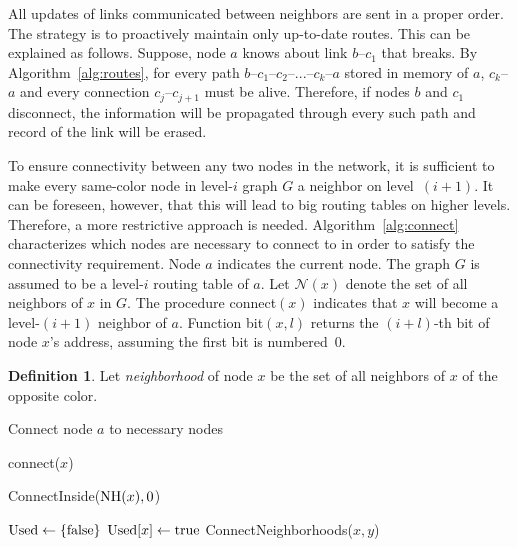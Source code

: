 \documentclass[conference]{IEEEtran}
\theoremstyle{definition}
\newtheorem{defn}{Definition}
\newcommand{\cN}{{\mathcal{N}}}
\begin{document}
All updates of links communicated between neighbors are sent in a proper order. The strategy is to proactively maintain only up-to-date routes. This can be explained as follows. Suppose, node $a$ knows about link $b$--$c_1$ that breaks. By Algorithm~\ref{alg:routes}, for every path $b$--$c_1$--$c_2$--...--$c_k$--$a$ stored in memory of $a$, $c_k$--$a$ and every connection $c_j$--$c_{j+1}$ must be alive. Therefore, if nodes $b$ and $c_1$ disconnect, the information will be propagated through every such path and record of the link will be erased.

To ensure connectivity between any two nodes in the network, it is sufficient to make every same-color node in level-$i$ graph $G$ a neighbor on level~$(i+1)$. It can be foreseen, however, that this will lead to big routing tables on higher levels. Therefore, a more restrictive approach is needed. Algorithm~\ref{alg:connect} characterizes which nodes are necessary to connect to in order to satisfy the connectivity requirement. Node $a$ indicates the current node. The graph $G$ is assumed to be a level-$i$ routing table of $a$. 
Let $\cN(x)$ denote the set of all neighbors of $x$ in $G$. The procedure  connect$(x)$ indicates that $x$ will become a level-$(i+1)$ neighbor of $a$. Function bit$(x, l)$ returns the $(i + l)$-th bit of node $x$'s address, assuming the first bit is numbered~0.

\begin{defn}
    Let \emph{neighborhood} of node $x$ be the set of all neighbors of $x$ of the opposite color.
    
    \label{defn:neighborhood}
\end{defn}

\begin{algorithm}
    \begin{algorithmic}[1]
        \caption{Connect node $a$ to necessary nodes}
        \label{alg:connect}

            \For {$ x \in \cN(a) \setminus {\rm NH}(a) $}
                \State connect($x$)
            \EndFor

                \State ConnectInside(${\rm NH}(x), 0$)

                \For {$ y \in \cN(x) \setminus {\rm NH}(x) $}
                    \State ${\rm Used} \gets \{ {\rm false} \}$
                    \State ${\rm Used}[x] \gets {\rm true}$
                    \State ConnectNeighborhoods($x, y$)
                \EndFor
            \EndFor
        \EndProcedure
        
    \end{algorithmic}
\end{algorithm}
\end{document}
